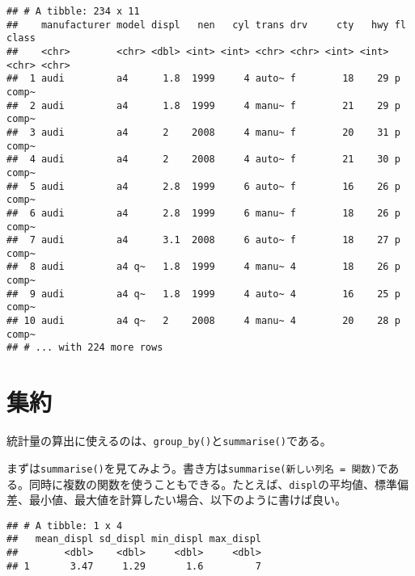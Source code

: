 \documentclass[]{book}
\newenvironment{Shaded}{\begin{snugshade}}{\end{snugshade}}
\newcommand{\KeywordTok}[1]{\textcolor[rgb]{0.13,0.29,0.53}{\textbf{#1}}}
\newcommand{\DataTypeTok}[1]{\textcolor[rgb]{0.13,0.29,0.53}{#1}}
\newcommand{\StringTok}[1]{\textcolor[rgb]{0.31,0.60,0.02}{#1}}
\newcommand{\OperatorTok}[1]{\textcolor[rgb]{0.81,0.36,0.00}{\textbf{#1}}}
\newcommand{\NormalTok}[1]{#1}
\begin{document}
\begin{verbatim}
## # A tibble: 234 x 11
##    manufacturer model displ   nen   cyl trans drv     cty   hwy fl    class
##    <chr>        <chr> <dbl> <int> <int> <chr> <chr> <int> <int> <chr> <chr>
##  1 audi         a4      1.8  1999     4 auto~ f        18    29 p     comp~
##  2 audi         a4      1.8  1999     4 manu~ f        21    29 p     comp~
##  3 audi         a4      2    2008     4 manu~ f        20    31 p     comp~
##  4 audi         a4      2    2008     4 auto~ f        21    30 p     comp~
##  5 audi         a4      2.8  1999     6 auto~ f        16    26 p     comp~
##  6 audi         a4      2.8  1999     6 manu~ f        18    26 p     comp~
##  7 audi         a4      3.1  2008     6 auto~ f        18    27 p     comp~
##  8 audi         a4 q~   1.8  1999     4 manu~ 4        18    26 p     comp~
##  9 audi         a4 q~   1.8  1999     4 auto~ 4        16    25 p     comp~
## 10 audi         a4 q~   2    2008     4 manu~ 4        20    28 p     comp~
## # ... with 224 more rows
\end{verbatim}

\section{集約}

統計量の算出に使えるのは、\texttt{group\_by()}と\texttt{summarise()}である。

まずは\texttt{summarise()}を見てみよう。書き方は\texttt{summarise(新しい列名\ =\ 関数)}である。同時に複数の関数を使うこともできる。たとえば、\texttt{displ}の平均値、標準偏差、最小値、最大値を計算したい場合、以下のように書けば良い。

\begin{Shaded}
\end{Shaded}

\begin{verbatim}
## # A tibble: 1 x 4
##   mean_displ sd_displ min_displ max_displ
##        <dbl>    <dbl>     <dbl>     <dbl>
## 1       3.47     1.29       1.6         7
\end{verbatim}
\end{document}
